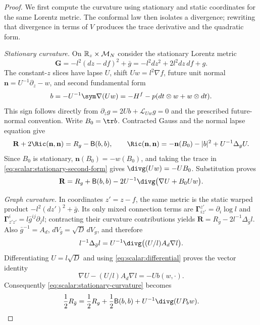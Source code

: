 \begin{proof}
We first compute the curvature using stationary and static coordinates
for the same Lorentz metric.  The conformal law then isolates a
divergence; rewriting that divergence in terms of $V$ produces the
trace derivative and the quadratic form.

\emph{Stationary curvature.} On $\mathbb R_z\times\mathcal M_N$ consider
the stationary Lorentz metric
\[
 \mathbf G=-l^2(dz-df)^2+\bar g
          =-l^2dz^2+2l^2dz\,df+g.
\]
The constant-$z$ slices have lapse $U$, shift $Uw=l^2\nabla f$,
future unit normal $\mathbf n=U^{-1}\partial_z-w$, and second
fundamental form
\begin{equation}
 b=-U^{-1}\sym\nabla(Uw)
   =-H^f-p(dt\otimes w+w\otimes dt).
 \label{eq:scalar:stationary-second-form}
\end{equation}
This sign follows directly from
$\partial_zg=2Ub+\mathcal L_{Uw}g=0$ and the prescribed future-normal
convention.  Write $B_0=\tr b$.  Contracted Gauss and the normal lapse
equation give
\[
 \mathbf R+2\mathbf\Ric(\mathbf n,\mathbf n)=R_g-\mathsf B(b,b),
 \qquad
 \mathbf\Ric(\mathbf n,\mathbf n)
   =-\mathbf n(B_0)-|b|^2+U^{-1}\Delta_gU.
\]
Since $B_0$ is stationary, $\mathbf n(B_0)=-w(B_0)$, and taking the
trace in \eqref{eq:scalar:stationary-second-form} gives
$\divg(Uw)=-UB_0$.  Substitution proves
\begin{equation}
 \mathbf R=R_g+\mathsf B(b,b)
  -2U^{-1}\divg\bigl(\nabla U+B_0Uw\bigr).
 \label{eq:scalar:stationary-curvature}
\end{equation}

\emph{Graph curvature.} In coordinates $z'=z-f$, the same metric
is the static warped product
$-l^2(dz')^2+\bar g$.  Its only mixed connection terms are
$\boldsymbol\Gamma^{z'}_{iz'}=\partial_i\log l$ and
$\boldsymbol\Gamma^i_{z'z'}=l\bar g^{ij}\partial_jl$; contracting
their curvature contributions yields
$\mathbf R=R_{\bar g}-2l^{-1}\Delta_{\bar g}l$.
Also $\bar g^{-1}=A_d$, $dV_{\bar g}=\sqrt D\,dV_g$, and therefore
\[
 l^{-1}\Delta_{\bar g}l
   =U^{-1}\divg\bigl((U/l)A_d\nabla l\bigr).
\]
Differentiating $U=l\sqrt D$ and using
\eqref{eq:scalar:differential} proves the vector identity
\[
 \nabla U-(U/l)A_d\nabla l=-Ub(w,\cdot).
\]
Consequently \eqref{eq:scalar:stationary-curvature} becomes
\begin{equation}
 \frac12R_{\bar g}
   =\frac12R_g+\frac12\mathsf B(b,b)
          +U^{-1}\divg(UP_bw).
 \label{eq:scalar:bar-first}
\end{equation}


\end{proof}
